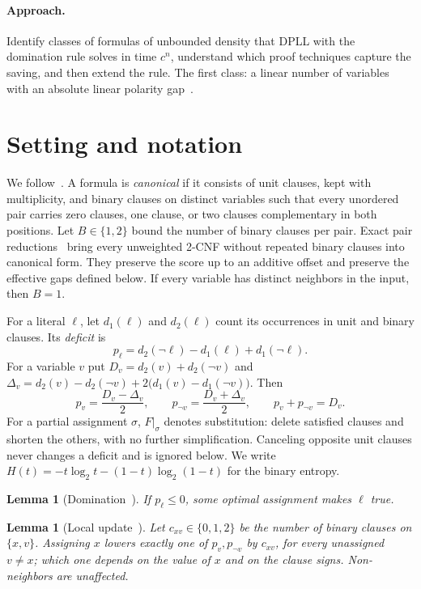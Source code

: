 \documentclass[11pt,a4paper]{article}
\newtheorem{lemma}[theorem]{Lemma}
\theoremstyle{remark}
\begin{document}
\paragraph{Approach.} Identify classes of formulas of unbounded density that
DPLL with the domination rule solves in time $c^n$, understand which proof
techniques capture the saving, and then extend the rule. The first class: a
linear number of variables with an absolute linear polarity gap~\cite{N2}.

\section{Setting and notation}\label{sec:setting}

We follow~\cite{N1,N2}. A formula is \emph{canonical} if it consists of unit
clauses, kept with multiplicity, and binary clauses on distinct variables such
that every unordered pair carries zero clauses, one clause, or two clauses
complementary in both positions. Let $B\in\{1,2\}$ bound the number of binary
clauses per pair. Exact pair reductions~\cite[Sec.~2]{N2} bring every
unweighted 2-CNF without repeated binary clauses into canonical form. They
preserve the score up to an additive offset and preserve the effective gaps
defined below. If every variable has distinct neighbors in the input, then
$B=1$.

For a literal $\ell$, let $d_1(\ell)$ and $d_2(\ell)$ count its occurrences in
unit and binary clauses. Its \emph{deficit} is
\[
 p_\ell=d_2(\neg\ell)-d_1(\ell)+d_1(\neg\ell).
\]
For a variable $v$ put $D_v=d_2(v)+d_2(\neg v)$ and
$\Delta_v=d_2(v)-d_2(\neg v)+2\bigl(d_1(v)-d_1(\neg v)\bigr)$. Then
\begin{equation}
 p_v=\frac{D_v-\Delta_v}{2},\qquad p_{\neg v}=\frac{D_v+\Delta_v}{2},\qquad
 p_v+p_{\neg v}=D_v.
 \label{eq:deficit-gap}
\end{equation}
For a partial assignment $\sigma$, $F|_\sigma$ denotes substitution: delete
satisfied clauses and shorten the others, with no further simplification.
Canceling opposite unit clauses never changes a deficit and is ignored below.
We write $H(t)=-t\log_2t-(1-t)\log_2(1-t)$ for the binary entropy.

\begin{lemma}[Domination~\cite{N1,N2}]\label{lem:dom}
If $p_\ell\le0$, some optimal assignment makes $\ell$ true.
\end{lemma}

\begin{lemma}[Local update~\cite{N2}]\label{lem:update}
Let $c_{xv}\in\{0,1,2\}$ be the number of binary clauses on $\{x,v\}$.
Assigning $x$ lowers exactly one of $p_v,p_{\neg v}$ by $c_{xv}$, for every
unassigned $v\ne x$; which one depends on the value of $x$ and on the clause
signs. Non-neighbors are unaffected.
\end{lemma}
\end{document}
